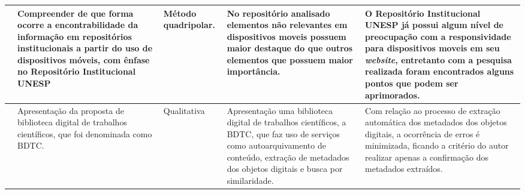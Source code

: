 \begin{landscape}
\begin{table}[H]
{\begin{tabular}{|p{5cm}|p{10cm}|p{8cm}|p{10cm}|p{12cm}|}
                \cite{FernandesMacedes:2019}         & Compreender de que forma ocorre a encontrabilidade da informação em repositórios institucionais a partir do uso de dispositivos móveis, com ênfase no Repositório Institucional UNESP                                 & Método quadripolar.                                                                                         & No repositório analisado elementos não relevantes em dispositivos moveis possuem maior destaque do que outros elementos que possuem maior importância.                                                & O Repositório Institucional UNESP já possui algum nível de preocupação com a responsividade para dispositivos moveis em seu \emph{website}, entretanto com a pesquisa realizada foram encontrados alguns pontos que podem ser aprimorados. \\ \hline
                \cite{CERVI:bdtc}                    & Apresentação da proposta de biblioteca digital de trabalhos científicos, que foi denominada como BDTC.                                                                                                                & Qualitativa                                                                                                 & Apresentação uma biblioteca digital de trabalhos científicos, a BDTC, que faz uso de serviços como autoarquivamento de conteúdo, extração de metadados dos objetos digitais e busca por similaridade. & Com relação ao processo de extração automática dos metadados dos objetos digitais, a ocorrência de erros é minimizada, ficando a critério do autor realizar apenas a confirmação dos metadados extraídos.                                  \\ \hline
            \end{tabular}%
        }
    \end{table}
\end{landscape}
